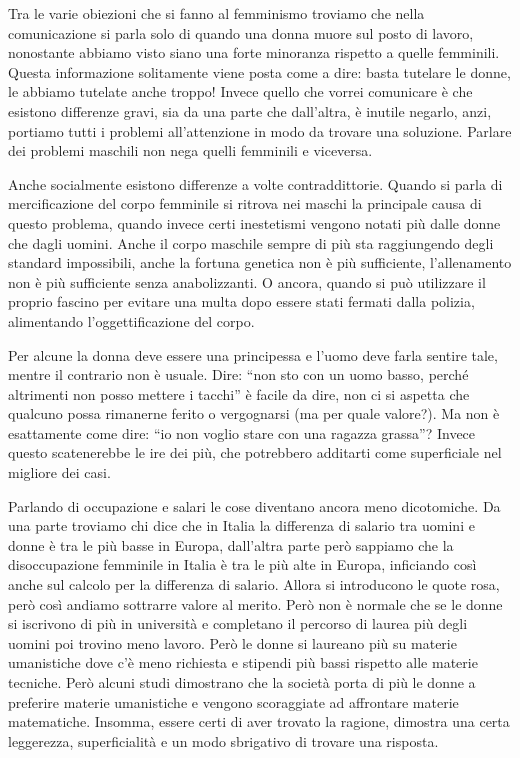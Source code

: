 \documentclass[12pt]{book} %
\begin{document}
\begin{mdframed}[linewidth=1pt]
Tra le varie obiezioni che si fanno al femminismo troviamo che nella comunicazione si parla solo di quando una donna
muore sul posto di lavoro, nonostante abbiamo visto siano una forte minoranza rispetto a quelle femminili. Questa
informazione solitamente viene posta come a dire: basta tutelare le donne, le abbiamo tutelate anche troppo! Invece
quello che vorrei comunicare è che esistono differenze gravi, sia da una parte che dall'altra, è
inutile negarlo, anzi, portiamo tutti i problemi all'attenzione in modo da trovare una soluzione.
Parlare dei problemi maschili non nega quelli femminili e viceversa.


\bigskip

Anche socialmente esistono differenze a volte contraddittorie. Quando si parla di mercificazione del corpo femminile si
ritrova nei maschi la principale causa di questo problema, quando invece certi inestetismi vengono notati più dalle
donne che dagli uomini. Anche il corpo maschile sempre di più sta raggiungendo degli standard impossibili, anche la
fortuna genetica non è più sufficiente, l'allenamento non è più sufficiente senza anabolizzanti. O
ancora, quando si può utilizzare il proprio fascino per evitare una multa dopo essere stati fermati dalla polizia,
alimentando l'oggettificazione del corpo.

Per alcune la donna deve essere una principessa e l'uomo deve farla sentire tale, mentre il contrario non è usuale.
Dire: “non sto con un uomo basso, perché altrimenti non posso mettere i tacchi” è facile da dire, non ci si aspetta che
qualcuno possa rimanerne ferito o vergognarsi (ma per quale valore?). Ma non è esattamente come dire: “io non voglio
stare con una ragazza grassa”? Invece questo scatenerebbe le ire dei più, che potrebbero additarti come superficiale
nel migliore dei casi. 


\bigskip

Parlando di occupazione e salari le cose diventano ancora meno dicotomiche. Da una parte troviamo chi dice che in Italia
la differenza di salario tra uomini e donne è tra le più basse in
Europa, dall'altra parte però
sappiamo che la disoccupazione femminile in Italia è tra le più alte in
Europa, inficiando così anche sul calcolo per la differenza di salario. Allora si introducono le quote rosa, però così
andiamo sottrarre valore al merito. Però non è normale che se le donne si iscrivono di più in università e completano
il percorso di laurea più degli uomini poi trovino meno lavoro. Però le donne si laureano più su materie umanistiche
dove c'è meno richiesta e stipendi più bassi rispetto alle materie tecniche. Però alcuni studi
dimostrano che la società porta di più le donne a preferire materie umanistiche e vengono scoraggiate ad affrontare
materie matematiche. Insomma, essere certi di aver trovato la ragione, dimostra una certa leggerezza, superficialità e
un modo sbrigativo di trovare una risposta. 



\end{mdframed}
\end{document}
